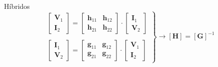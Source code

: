 \documentclass[aspectratio=169, usenames,svgnames,dvipsnames]{beamer}
\begin{document}
\begin{frame}[label={sec:orgaf4dffe}]{Híbridos}
\[
  \left.
    \begin{array}{l}
  \left[
    \begin{array}{c}
      \mathbf{V}_1\\
      \mathbf{I}_2
    \end{array}
  \right] =
  \left[
    \begin{array}{cc}
      \mathbf{h}_{11} & \mathbf{h}_{12}\\
      \mathbf{h}_{21} & \mathbf{h}_{22}
    \end{array}
  \right] \cdot
  \left[
    \begin{array}{c}
      \mathbf{I}_1\\
      \mathbf{V}_2
    \end{array}
      \right]
      \\ \\
  \left[
    \begin{array}{c}
      \mathbf{I}_1\\
      \mathbf{V}_2
    \end{array}
  \right] =
  \left[
    \begin{array}{cc}
      \mathbf{g}_{11} & \mathbf{g}_{12}\\
      \mathbf{g}_{21} & \mathbf{g}_{22}
    \end{array}
  \right] \cdot
  \left[
    \begin{array}{c}
      \mathbf{V}_1\\
      \mathbf{I}_2
    \end{array}
      \right]
      \end{array}
    \right\}
      \rightarrow
      \boxed{[\mathbf{H}] = [\mathbf{G}]^{-1}}
    \]
\end{frame}
\end{document}
